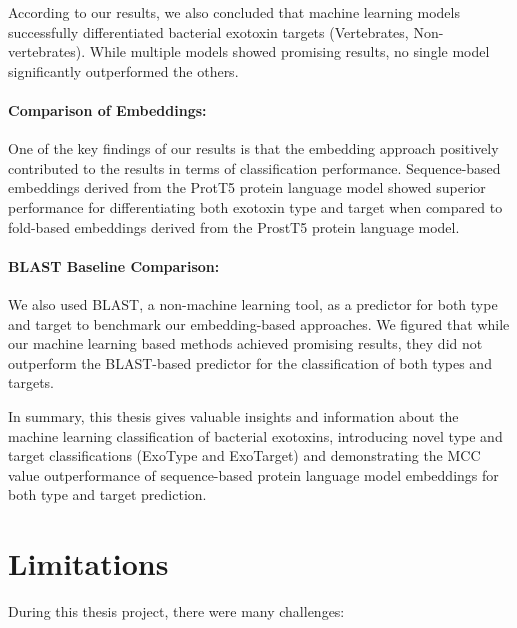 According to our results, we also concluded that machine learning models successfully differentiated bacterial exotoxin targets (Vertebrates, Non-vertebrates).
While multiple models showed promising results, no single model significantly outperformed the others.

\pagebreak

\paragraph{Comparison of Embeddings:}

One of the key findings of our results is that the embedding approach positively contributed to the results in terms of classification performance. 
Sequence-based embeddings derived from the \gls{ProtT5} protein language model showed superior performance for differentiating both exotoxin type and target when compared to fold-based embeddings derived from the \gls{ProstT5} protein language model.

\paragraph{BLAST Baseline Comparison:}

We also used BLAST, a non-machine learning tool, as a predictor for both type and target to benchmark our embedding-based approaches.
We figured that while our machine learning based methods achieved promising results, they did not outperform the BLAST-based predictor for the classification of both types and targets.



In summary, this thesis gives valuable insights and information about the machine learning classification of bacterial exotoxins, introducing novel type and target classifications (ExoType and ExoTarget) and demonstrating the MCC value outperformance of sequence-based protein language model embeddings for both type and target prediction.


\section{Limitations}
During this thesis project, there were many challenges:

